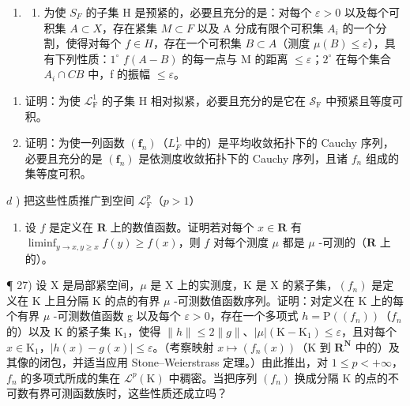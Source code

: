 \begin{enumerate}
\def\labelenumi{\arabic{enumi})}
\setcounter{enumi}{24}
\tightlist
\item
  \begin{enumerate}
  \def\labelenumii{\alph{enumii})}
  \tightlist
  \item
    为使 \(S_{F}\) 的子集 H 是预紧的，必要且充分的是：对每个 \(\varepsilon > 0\) 以及每个可积集 \(A \subset X\)，存在紧集 \(M \subset F\) 以及 A 分成有限个可积集 \(A_{i}\) 的一个分割，使得对每个 \(f \in H\)，存在一个可积集 \(B \subset A\)（测度 \(\mu(B) \leqslant \varepsilon\)），具有下列性质：\(1^{\circ}\) \(f(A - B)\) 的每一点与 M 的距离 \(\leqslant \varepsilon\)；\(2^{\circ}\) 在每个集合 \(A_{i} \cap C B\) 中，f 的振幅 \(\leqslant \varepsilon\)。
  \end{enumerate}
\end{enumerate}

\begin{enumerate}
\def\labelenumi{\alph{enumi})}
\setcounter{enumi}{1}
\item
  证明：为使 \(\mathcal{L}_{\mathrm{F}}^{1}\) 的子集 H 相对拟紧，必要且充分的是它在 \(\mathcal{S}_{\mathrm{F}}\) 中预紧且等度可积。
\item
  证明：为使一列函数 \((\mathbf{f}_{n})\)（\(L_{F}^{1}\) 中的）是平均收敛拓扑下的 Cauchy 序列，必要且充分的是 \((\mathbf{f}_{n})\) 是依测度收敛拓扑下的 Cauchy 序列，且诸 \(f_{n}\) 组成的集等度可积。
\end{enumerate}

\(d\) ) 把这些性质推广到空间 \(\mathcal{L}_{\mathrm{F}}^{p}\)（\(p > 1\)）

\begin{enumerate}
\def\labelenumi{\arabic{enumi})}
\setcounter{enumi}{25}
\tightlist
\item
  设 \(f\) 是定义在 \(\mathbf{R}\) 上的数值函数。证明若对每个 \(x \in \mathbf{R}\) 有 \(\liminf_{y \to x, y \geqslant x} f(y) \geqslant f(x)\)，则 \(f\) 对每个测度 \(\mu\) 都是 \(\mu\) -可测的（\(\mathbf{R}\) 上的）。
\end{enumerate}

¶ 27) 设 X 是局部紧空间，\(\mu\) 是 X 上的实测度，K 是 X 的紧子集，\((f_n)\) 是定义在 K 上且分隔 K 的点的有界 \(\mu\) -可测数值函数序列。证明：对定义在 K 上的每个有界 \(\mu\) -可测数值函数 g 以及每个 \(\varepsilon > 0\)，存在一个多项式 \(h = \mathrm{P}((f_n))\)（\(f_n\) 的）以及 K 的紧子集 \(\mathrm{K}_1\)，使得 \(\|h\| \leqslant 2\|g\|\)、\(|\mu|(\mathrm{K} - \mathrm{K}_1) \leqslant \varepsilon\)，且对每个 \(x \in \mathrm{K}_1\)，\(|h(x) - g(x)| \leqslant \varepsilon\)。（考察映射 \(x \mapsto (f_n(x))\)（K 到 \(\mathbf{R}^{\mathbf{N}}\) 中的）及其像的闭包，并适当应用 Stone--Weierstrass 定理。）由此推出，对 \(1 \leqslant p < +\infty\)，\(f_n\) 的多项式所成的集在 \(\mathcal{L}^p(\mathrm{K})\) 中稠密。当把序列 \((f_n)\) 换成分隔 K 的点的不可数有界可测函数族时，这些性质还成立吗？

